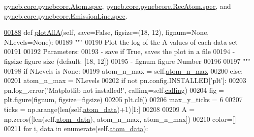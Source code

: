 \hyperlink{pynebcore_8py_source_l01166}{pyneb.\+core.\+pynebcore.\+Atom.\+spec}, \hyperlink{pynebcore_8py_source_l02566}{pyneb.\+core.\+pynebcore.\+Rec\+Atom.\+spec}, and \hyperlink{pynebcore_8py_source_l03268}{pyneb.\+core.\+pynebcore.\+Emission\+Line.\+spec}.


\begin{DoxyCode}
\hypertarget{classpyneb_1_1plot_1_1plot_atomic_data_1_1_data_plot_l00188}{}\hyperlink{classpyneb_1_1plot_1_1plot_atomic_data_1_1_data_plot_a0b245c7f8b97681b15beadcef38a0021}{00188}     \textcolor{keyword}{def }\hyperlink{classpyneb_1_1plot_1_1plot_atomic_data_1_1_data_plot_a0b245c7f8b97681b15beadcef38a0021}{plotAllA}(self, save=False, figsize=(18, 12), fignum=\textcolor{keywordtype}{None}, NLevels=\textcolor{keywordtype}{None}):
00189         \textcolor{stringliteral}{"""}
00190 \textcolor{stringliteral}{        Plot the log of the A values of each data set }
00191 \textcolor{stringliteral}{        }
00192 \textcolor{stringliteral}{        Parameters:}
00193 \textcolor{stringliteral}{            - save     if True, saves the plot in a file}
00194 \textcolor{stringliteral}{            - figsize  figure size (default: [18, 12])}
00195 \textcolor{stringliteral}{            - fignum    figure Number}
00196 \textcolor{stringliteral}{}
00197 \textcolor{stringliteral}{        """}
00198         \textcolor{keywordflow}{if} NLevels \textcolor{keywordflow}{is} \textcolor{keywordtype}{None}:
00199             atom\_n\_max = self.\hyperlink{classpyneb_1_1plot_1_1plot_atomic_data_1_1_data_plot_a668572cfe9a684e7195535d60d343938}{atom\_n\_max}
00200         \textcolor{keywordflow}{else}:
00201             atom\_n\_max = NLevels
00202         \textcolor{keywordflow}{if} \textcolor{keywordflow}{not} pn.config.INSTALLED[\textcolor{stringliteral}{'plt'}]:
00203             pn.log\_.error(\textcolor{stringliteral}{'Matplotlib not installed!'}, calling=self.\hyperlink{classpyneb_1_1plot_1_1plot_atomic_data_1_1_data_plot_a393a133b607541c57d5ebc5a34687e3f}{calling})
00204         fig = plt.figure(fignum, figsize=figsize)
00205         plt.clf()
00206         max\_y\_ticks = 6
00207         ticks = np.arange(len(self.\hyperlink{classpyneb_1_1plot_1_1plot_atomic_data_1_1_data_plot_aee33ad460a38cb4293a5bd89cec12294}{atom\_data})+1)[1:] 
00208         
00209         A = np.zeros([len(self.\hyperlink{classpyneb_1_1plot_1_1plot_atomic_data_1_1_data_plot_aee33ad460a38cb4293a5bd89cec12294}{atom\_data}), atom\_n\_max, atom\_n\_max])
00210         color=[]
00211         \textcolor{keywordflow}{for} i, data \textcolor{keywordflow}{in} enumerate(self.\hyperlink{classpyneb_1_1plot_1_1plot_atomic_data_1_1_data_plot_aee33ad460a38cb4293a5bd89cec12294}{atom\_data}):

\end{DoxyCode}
